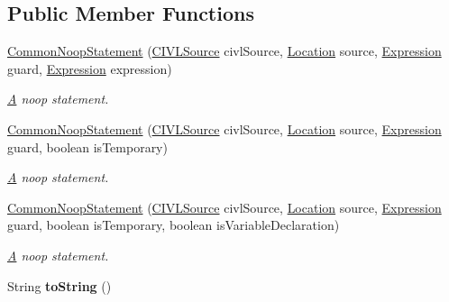 \subsection*{Public Member Functions}
\begin{DoxyCompactItemize}
\item 
\hyperlink{classedu_1_1udel_1_1cis_1_1vsl_1_1civl_1_1model_1_1common_1_1statement_1_1CommonNoopStatement_ac6b237f9e79e7e735887ef154286724a}{Common\+Noop\+Statement} (\hyperlink{interfaceedu_1_1udel_1_1cis_1_1vsl_1_1civl_1_1model_1_1IF_1_1CIVLSource}{C\+I\+V\+L\+Source} civl\+Source, \hyperlink{interfaceedu_1_1udel_1_1cis_1_1vsl_1_1civl_1_1model_1_1IF_1_1location_1_1Location}{Location} source, \hyperlink{interfaceedu_1_1udel_1_1cis_1_1vsl_1_1civl_1_1model_1_1IF_1_1expression_1_1Expression}{Expression} guard, \hyperlink{interfaceedu_1_1udel_1_1cis_1_1vsl_1_1civl_1_1model_1_1IF_1_1expression_1_1Expression}{Expression} expression)
\begin{DoxyCompactList}\small\item\em \hyperlink{structA}{A} noop statement. \end{DoxyCompactList}\item 
\hyperlink{classedu_1_1udel_1_1cis_1_1vsl_1_1civl_1_1model_1_1common_1_1statement_1_1CommonNoopStatement_a51328c95ae4df27337c5cda0811c9e2f}{Common\+Noop\+Statement} (\hyperlink{interfaceedu_1_1udel_1_1cis_1_1vsl_1_1civl_1_1model_1_1IF_1_1CIVLSource}{C\+I\+V\+L\+Source} civl\+Source, \hyperlink{interfaceedu_1_1udel_1_1cis_1_1vsl_1_1civl_1_1model_1_1IF_1_1location_1_1Location}{Location} source, \hyperlink{interfaceedu_1_1udel_1_1cis_1_1vsl_1_1civl_1_1model_1_1IF_1_1expression_1_1Expression}{Expression} guard, boolean is\+Temporary)
\begin{DoxyCompactList}\small\item\em \hyperlink{structA}{A} noop statement. \end{DoxyCompactList}\item 
\hyperlink{classedu_1_1udel_1_1cis_1_1vsl_1_1civl_1_1model_1_1common_1_1statement_1_1CommonNoopStatement_a7f65ac6e5a8f24525522333b3def96b2}{Common\+Noop\+Statement} (\hyperlink{interfaceedu_1_1udel_1_1cis_1_1vsl_1_1civl_1_1model_1_1IF_1_1CIVLSource}{C\+I\+V\+L\+Source} civl\+Source, \hyperlink{interfaceedu_1_1udel_1_1cis_1_1vsl_1_1civl_1_1model_1_1IF_1_1location_1_1Location}{Location} source, \hyperlink{interfaceedu_1_1udel_1_1cis_1_1vsl_1_1civl_1_1model_1_1IF_1_1expression_1_1Expression}{Expression} guard, boolean is\+Temporary, boolean is\+Variable\+Declaration)
\begin{DoxyCompactList}\small\item\em \hyperlink{structA}{A} noop statement. \end{DoxyCompactList}\item 
\hypertarget{classedu_1_1udel_1_1cis_1_1vsl_1_1civl_1_1model_1_1common_1_1statement_1_1CommonNoopStatement_a88af25ca9ce1a824eae6d09e0922af95}{}String {\bfseries to\+String} ()\label{classedu_1_1udel_1_1cis_1_1vsl_1_1civl_1_1model_1_1common_1_1statement_1_1CommonNoopStatement_a88af25ca9ce1a824eae6d09e0922af95}


\end{DoxyCompactItemize}
